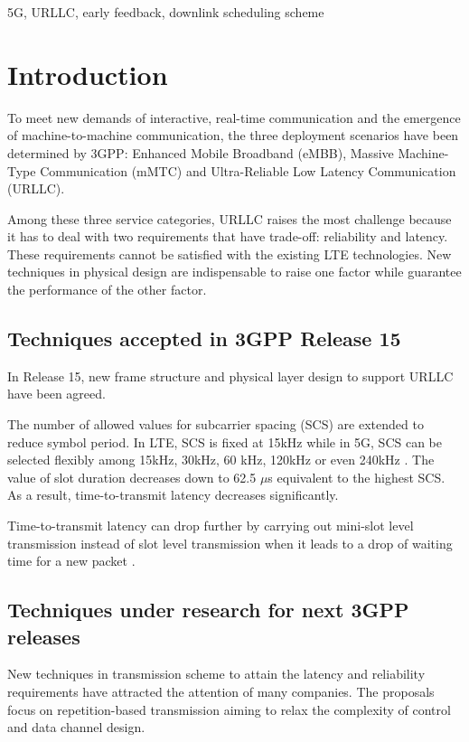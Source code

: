 \documentclass[conference]{IEEEtran}
\begin{document}
\begin{IEEEkeywords}
5G, URLLC, early feedback, downlink scheduling scheme 
\end{IEEEkeywords}

\section{Introduction}
To meet new demands of interactive, real-time communication and the emergence of machine-to-machine communication, the three deployment scenarios have been determined by 3GPP: Enhanced Mobile Broadband (eMBB), Massive Machine-Type Communication (mMTC) and Ultra-Reliable Low Latency Communication (URLLC). 

Among these three service categories, URLLC raises the most challenge because it has to deal with two requirements that have trade-off: reliability and latency. These requirements cannot be satisfied with the existing LTE technologies. New techniques in physical design are indispensable to raise one factor while guarantee the performance of the other factor.

\subsection{Techniques accepted in 3GPP Release 15}\label{IAA}
In Release 15, new frame structure and physical layer design to support URLLC have been agreed.

The number of allowed values for subcarrier spacing (SCS) are extended to reduce symbol period. In LTE, SCS is fixed at 15kHz while in 5G, SCS can be selected flexibly among 15kHz, 30kHz, 60 kHz, 120kHz or even 240kHz \cite{ad2}. The value of slot duration decreases down to 62.5 $\mu$s equivalent to the highest SCS.  As a result, time-to-transmit latency decreases significantly.

Time-to-transmit latency can drop further by carrying out mini-slot level transmission instead of slot level transmission when it leads to a drop of waiting time for a new packet \cite{ad3}.

\subsection{Techniques under research for next 3GPP releases}\label{IBB}
New techniques in transmission scheme to attain the latency and reliability requirements have attracted the attention of many companies. The proposals focus on repetition-based transmission aiming to relax the complexity of control and data channel design. 
\end{document}
